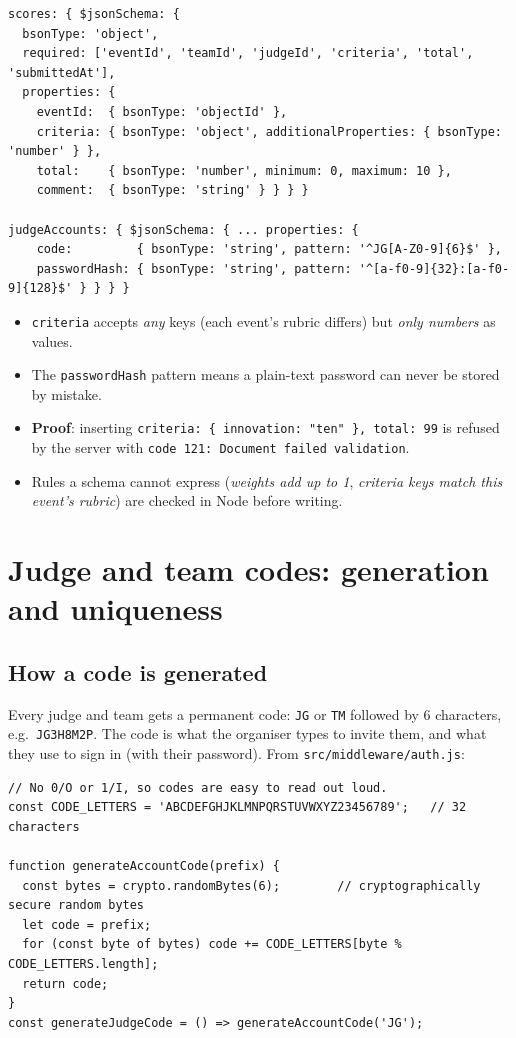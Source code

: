 \documentclass[11pt,a4paper]{article}
\begin{document}
\begin{lstlisting}
scores: { $jsonSchema: {
  bsonType: 'object',
  required: ['eventId', 'teamId', 'judgeId', 'criteria', 'total', 'submittedAt'],
  properties: {
    eventId:  { bsonType: 'objectId' },
    criteria: { bsonType: 'object', additionalProperties: { bsonType: 'number' } },
    total:    { bsonType: 'number', minimum: 0, maximum: 10 },
    comment:  { bsonType: 'string' } } } }

judgeAccounts: { $jsonSchema: { ... properties: {
    code:         { bsonType: 'string', pattern: '^JG[A-Z0-9]{6}$' },
    passwordHash: { bsonType: 'string', pattern: '^[a-f0-9]{32}:[a-f0-9]{128}$' } } } }
\end{lstlisting}

\begin{itemize}[leftmargin=1.4em]
  \item \texttt{criteria} accepts \emph{any} keys (each event's rubric differs) but \emph{only numbers} as values.
  \item The \texttt{passwordHash} pattern means a plain-text password can never be stored by mistake.
  \item \textbf{Proof}: inserting \texttt{criteria: \{ innovation: "ten" \}, total: 99} is refused by the server with
        \texttt{code 121: Document failed validation}.
  \item Rules a schema cannot express (\emph{weights add up to 1}, \emph{criteria keys match this event's rubric})
        are checked in Node before writing.
\end{itemize}

\section{Judge and team codes: generation and uniqueness}

\subsection{How a code is generated}
Every judge and team gets a permanent code: \texttt{JG} or \texttt{TM} followed by 6 characters, e.g.\
\texttt{JG3H8M2P}. The code is what the organiser types to invite them, and what they use to sign in (with their
password). From \texttt{src/middleware/auth.js}:

\begin{lstlisting}
// No 0/O or 1/I, so codes are easy to read out loud.
const CODE_LETTERS = 'ABCDEFGHJKLMNPQRSTUVWXYZ23456789';   // 32 characters

function generateAccountCode(prefix) {
  const bytes = crypto.randomBytes(6);        // cryptographically secure random bytes
  let code = prefix;
  for (const byte of bytes) code += CODE_LETTERS[byte % CODE_LETTERS.length];
  return code;
}
const generateJudgeCode = () => generateAccountCode('JG');
\end{lstlisting}
\end{document}
